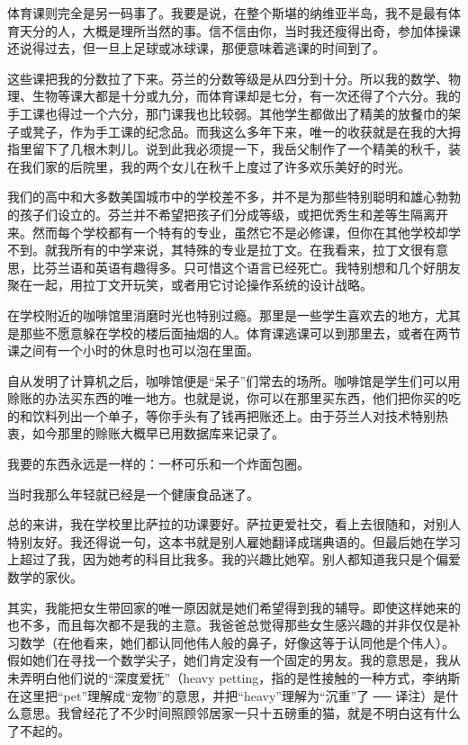 体育课则完全是另一码事了。我要是说，在整个斯堪的纳维亚半岛，我不是最有体育天分的人，大概是理所当然的事。信不信由你，当时我还瘦得出奇，参加体操课还说得过去，但一旦上足球或冰球课，那便意味着逃课的时间到了。

这些课把我的分数拉了下来。芬兰的分数等级是从四分到十分。所以我的数学、物理、生物等课大都是十分或九分，而体育课却是七分，有一次还得了个六分。我的手工课也得过一个六分，那门课我也比较弱。其他学生都做出了精美的放餐巾的架子或凳子，作为手工课的纪念品。而我这么多年下来，唯一的收获就是在我的大拇指里留下了几根木刺儿。说到此我必须提一下，我岳父制作了一个精美的秋千，装在我们家的后院里，我的两个女儿在秋千上度过了许多欢乐美好的时光。

我们的高中和大多数美国城市中的学校差不多，并不是为那些特别聪明和雄心勃勃的孩子们设立的。芬兰并不希望把孩子们分成等级，或把优秀生和差等生隔离开来。然而每个学校都有一个特有的专业，虽然它不是必修课，但你在其他学校却学不到。就我所有的中学来说，其特殊的专业是拉丁文。在我看来，拉丁文很有意思，比芬兰语和英语有趣得多。只可惜这个语言已经死亡。我特别想和几个好朋友聚在一起，用拉丁文开玩笑，或者用它讨论操作系统的设计战略。

在学校附近的咖啡馆里消磨时光也特别过瘾。那里是一些学生喜欢去的地方，尤其是那些不愿意躲在学校的楼后面抽烟的人。体育课逃课可以到那里去，或者在两节课之间有一个小时的休息时也可以泡在里面。

自从发明了计算机之后，咖啡馆便是“呆子”们常去的场所。咖啡馆是学生们可以用赊账的办法买东西的唯一地方。也就是说，你可以在那里买东西，他们把你买的吃的和饮料列出一个单子，等你手头有了钱再把账还上。由于芬兰人对技术特别热衷，如今那里的赊账大概早已用数据库来记录了。

我要的东西永远是一样的：一杯可乐和一个炸面包圈。

当时我那么年轻就已经是一个健康食品迷了。

总的来讲，我在学校里比萨拉的功课要好。萨拉更爱社交，看上去很随和，对别人特别友好。我还得说一句，这本书就是别人雇她翻译成瑞典语的。但最后她在学习上超过了我，因为她考的科目比我多。我的兴趣比她窄。别人都知道我只是个偏爱数学的家伙。

其实，我能把女生带回家的唯一原因就是她们希望得到我的辅导。即使这样她来的也不多，而且每次都不是我的主意。我爸爸总觉得那些女生感兴趣的并非仅仅是补习数学（在他看来，她们都认同他伟人般的鼻子，好像这等于认同他是个伟人）。假如她们在寻找一个数学尖子，她们肯定没有一个固定的男友。我的意思是，我从未弄明白他们说的“深度爱抚”（heavy petting，指的是性接触的一种方式，李纳斯在这里把“pet”理解成“宠物”的意思，并把“heavy”理解为“沉重”了 ── 译注）是什么意思。我曾经花了不少时间照顾邻居家一只十五磅重的猫，就是不明白这有什么了不起的。

